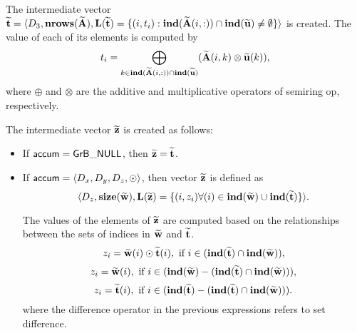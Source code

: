 The intermediate vector ${\bf \widetilde{t}} = \langle
D_3, \bold{nrows}({\bf \widetilde{A}}),
\bold{L}({\bf \widetilde{t}}) =
\{(i,t_i) : \bold{ind}({\bf \widetilde{A}}(i,:)) \cap 
\bold{ind}({\bf \widetilde{u}})
 \neq \emptyset \} \rangle$
is created.  The value of each of its elements is computed by 
\[t_i = \bigoplus_{k \in \bold{ind}({\bf \widetilde{A}}(i,:)) \cap
\bold{ind}({\bf \widetilde{u}})} ({\bf \widetilde{A}}(i,k)
\otimes {\bf \widetilde{u}}(k)),\] where $\oplus$ and $\otimes$
are the additive and multiplicative operators of semiring {\sf op},
respectively.

The intermediate vector ${\bf \widetilde{z}}$ is created as follows:
\begin{itemize}
    \item If ${\sf accum} = {\sf GrB\_NULL}$, then ${\bf \widetilde{z}} = {\bf \widetilde{t}}$.
    
    \item If ${\sf accum} = \langle D_x, D_y, D_z, \odot \rangle$, then vector ${\bf \widetilde{z}}$ is defined as 
        \[ \langle D_z, \bold{size}({\bf \widetilde{w}}), 
        \bold{L}({\bf \widetilde{z}}) 
		= \{(i,z_{i})  \forall (i) \in \bold{ind}({\bf \widetilde{w}}) \cup 
        \bold{ind}({\bf \widetilde{t}}) \} \rangle.\]  

    The values of the elements of ${\bf \widetilde{z}}$ are computed based on the 
    relationships between the sets of indices in ${\bf \widetilde{w}}$ and 
    ${\bf \widetilde{t}}$.
\[
z_{i} = {\bf \widetilde{w}}(i) \odot {\bf \widetilde{t}}(i), \ \mbox{if}\  i \in  (\bold{ind}({\bf \widetilde{t}}) \cap \bold{ind}({\bf \widetilde{w}})),
\]
\[
z_{i} = \vector{\widetilde{w}}(i), \ \mbox{if}\  i \in  (\bold{ind}(\vector{\widetilde{w}}) - (\bold{ind}(\vector{\widetilde{t}}) \cap \bold{ind}(\vector{\widetilde{w}}))),
\]
\[
z_{i} = \vector{\widetilde{t}}(i), \ \mbox{if}\  i \in  (\bold{ind}(\vector{\widetilde{t}}) - (\bold{ind}(\vector{\widetilde{t}}) \cap \bold{ind}(\vector{\widetilde{w}}))).
\]
where the difference operator in the previous expressions refers to set difference.
\end{itemize}

